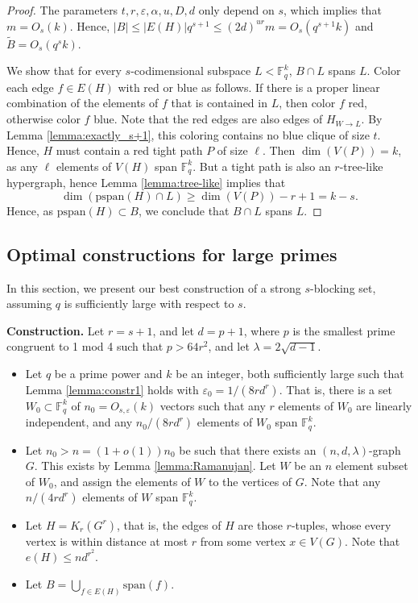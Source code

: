 \documentclass[11pt]{article}
\theoremstyle{plain}
\theoremstyle{definition}
\begin{document}
\begin{proof}
The parameters $t,r,\varepsilon,\alpha,u,D,d$ only depend on $s$, which implies that $m=O_s(k)$. Hence, $|B|\leq |E(H)|q^{s+1}\leq (2d)^{ur} m=O_s(q^{s+1}k)$ and $\tilde{B}=O_s(q^s k)$.

We show that for every $s$-codimensional subspace $L<\mathbb{F}_q^k$, $B\cap L$ spans $L$. Color each edge $f\in E(H)$ with red or blue as follows. If there is a proper linear combination of the elements of $f$ that is contained in $L$, then color $f$ red, otherwise color $f$ blue. Note that the red edges are also edges of $H_{W\rightarrow L}$. By Lemma \ref{lemma:exactly_s+1}, this coloring contains no blue clique of size $t$. Hence, $H$ must contain a red tight path $P$ of size $\ell$. Then $\dim(V(P))=k$, as any $\ell$ elements of $V(H)$ span $\mathbb{F}_q^k$. But a tight path is also an $r$-tree-like hypergraph, hence Lemma \ref{lemma:tree-like} implies that $$\dim(\mbox{pspan}(H)\cap L)\geq \dim(V(P))-r+1=k-s.$$
Hence, as $\mbox{pspan}(H)\subset B$, we conclude that $B\cap L$ spans $L$.
\end{proof}

\subsection{Optimal constructions for large primes}\label{sect:large_prime}

 In this section, we present our best construction of a strong $s$-blocking set, assuming $q$ is sufficiently large with respect to $s$.

 \medskip

\noindent
\textbf{Construction.} Let $r=s+1$, and let $d=p+1$, where $p$ is the smallest prime congruent to 1 mod 4 such that $p>64r^2$, and let $\lambda=2\sqrt{d-1}$.
\begin{itemize}
    \item Let $q$ be a prime power and $k$ be an integer, both sufficiently large such that Lemma \ref{lemma:constr1} holds with $\varepsilon_0=1/(8rd^r)$. That is, there is a set $W_0\subset \mathbb{F}_q^k$  of $n_0=O_{s,\varepsilon}(k)$ vectors such that any $r$ elements of $W_0$ are linearly independent, and any $n_0/(8rd^r)$ elements of $W_0$ span $\mathbb{F}_q^k$.
    \item Let $n_0>n=(1+o(1))n_0$ be such that there exists an $(n,d,\lambda)$-graph $G$. This exists by Lemma \ref{lemma:Ramanujan}. Let $W$ be an $n$ element subset of $W_0$, and assign the elements of $W$ to the vertices of $G$. Note that any $n/(4rd^r)$ elements of $W$ span $\mathbb{F}_q^k$.
    \item Let $H=K_r(G^r)$, that is, the edges of $H$ are those $r$-tuples, whose every vertex is within distance at most $r$ from some vertex $x\in V(G)$. Note that $e(H)\leq n d^{r^2}$.
   
    \item Let $B=\bigcup_{f\in E(H)}\mbox{span}(f)$.
\end{itemize}
\end{document}
